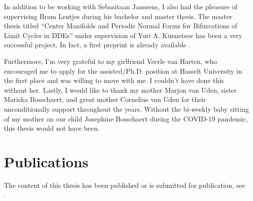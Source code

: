 In addition to be working with Sebasitaan Janssens, I also had the pleasure of
supervising Bram Lentjes during his bachelor and master thesis. The master thesis
titled ``Center Manifolds and Periodic Normal Forms for Bifurcations of Limit
Cycles in DDEs'' under supervision of Yuri A. Kuznetsov has been a very
successful project. In fact, a first preprint is already available
\cite{Bram@2022}.

Furthermore, I'm very grateful to my girlfriend Veerle van Harten, who encouraged
me to apply for the assisted/Ph.D. position at Hasselt University in the first
place and was willing to move with me. I couldn't have done this without her.
Lastly, I would like to thank my mother Marjon van Uden, sister Mariska
Bosschaert, and great mother Cornelius van Uden for their unconditionally support
throughout the years. Without the bi-weekly baby sitting of my mother on our
child Josephine Bosschaert during the COVID-19 pandemic, this thesis would not
have been.


\section{Publications}
The content of this thesis has been published or is submitted for publication,
see \cite{Bosschaert@Interplay,Switching2019,PhysRevD.105.065021}.
